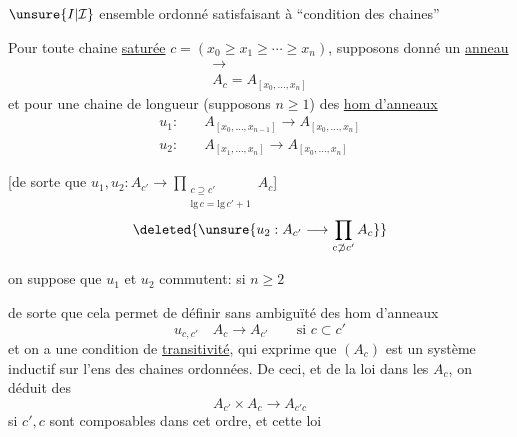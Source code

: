 $\unsure{I|\mathcal I}$ ensemble ordonné satisfaisant à ``condition des chaines''

Pour toute chaine \uline{saturée} $c=(x_0\geq x_1\geq\cdots\geq x_n)$, supposons donné un \uline{anneau}
\[\begin{aligned}\longrightarrow\\A_c=A_{[x_0,\ldots,x_n]}\end{aligned}\]
et pour une chaine de longueur  (supposons $n\geq1$) des \uline{hom d'anneaux}
\[
\begin{aligned}
u_1:\quad&A_{[x_0,\ldots,x_{n-1}]}\longrightarrow A_{[x_0,\ldots,x_n]}\\
u_2:\quad&A_{[x_1,\ldots,x_n]}\longrightarrow A_{[x_0,\ldots,x_n]}
\end{aligned}
\]

[de sorte que $u_1,u_2:A_{c'}\longrightarrow\displaystyle\prod_{\substack{c\supseteq c'\\\mathrm{lg}\,c=\mathrm{lg}\,c'+1}}A_c$]
\[\deleted{\unsure{u_2:A_{c'}\longrightarrow\prod_{c\not\supset c'} A_c}}\]

on suppose que $u_1$ et $u_2$ commutent: si $n\geq2$

de sorte que cela permet de définir sans ambiguïté des hom d'anneaux
\[u_{c,c'}\quad A_c\longrightarrow A_{c'}\qquad\text{si }c\subset c'\]
\deleted{[\unsure{donc}} et on a une condition de \uline{transitivité}, qui exprime que $(A_c)$ est un système inductif sur l'ens des chaines ordonnées. De ceci, et de la loi \uline{} dans les $A_c$, on déduit des  
\[A_{c'}\times A_c\longrightarrow A_{c'c}\]
si $c',c$ sont composables dans cet ordre, et cette loi
